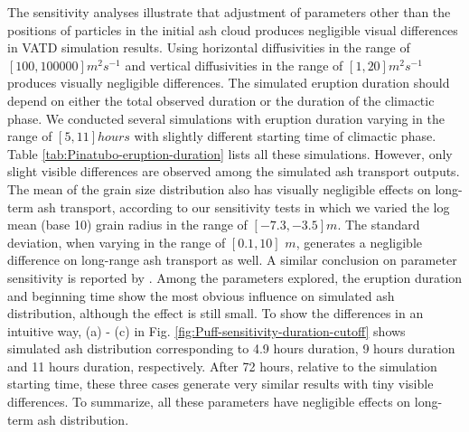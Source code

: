 \documentclass[utf8]{frontiersSCNS} %
\begin{document}
The sensitivity analyses illustrate that adjustment of parameters other than the positions of particles in the initial ash cloud produces negligible visual differences in VATD simulation results. Using horizontal diffusivities in the range of $[100, 100000] m^2s^{-1} $ and vertical diffusivities in the range of $[1, 20] m^2s^{-1}$ produces visually negligible differences. The simulated eruption duration should depend on either the total observed duration or the duration of the climactic phase. We conducted several simulations with eruption duration varying in the range of $[5, 11] hours$ with slightly different starting time of climactic phase. Table \ref{tab:Pinatubo-eruption-duration} lists all these simulations. However, only slight visible differences are observed among the simulated ash transport outputs. The mean of the grain size distribution also has visually negligible effects on long-term ash transport, according to our sensitivity tests in which we varied the log mean (base 10) grain radius in the range of $[-7.3, -3.5] m$. The standard deviation, when varying in the range of $[0.1, 10]$ $m$, generates a negligible difference on long-range ash transport as well. A similar conclusion on parameter sensitivity is reported by \citet[e.g.][]{fero2008simulation, daniele2009applications}. Among the parameters explored, the eruption duration and beginning time show the most obvious influence on simulated ash distribution, although the effect is still small. To show the differences in an intuitive way, 
(a) - (c) in Fig. \ref{fig:Puff-sensitivity-duration-cutoff} shows simulated ash distribution corresponding to 4.9 hours duration, 9 hours duration and 11 hours duration, respectively. After 72 hours, relative to the simulation starting time, these three cases generate very similar results with tiny visible differences. To summarize, all these parameters have negligible effects on long-term ash distribution.
\end{document}
